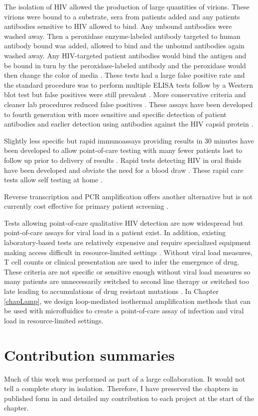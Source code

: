 \documentclass[../sherrill-Mix_thesis.tex]{subfiles}
\begin{document}
	The isolation of HIV \citep{Barre-Sinoussi1983,Gallo1983,Popovic1984,Levy1984} allowed the production of large quantities of virions. These virions were bound to a substrate, sera from patients added and any patients antibodies sensitive to HIV allowed to bind. Any unbound antibodies were washed away. Then a peroxidase enzyme-labeled antibody targeted to human antibody bound was added, allowed to bind and the unbound antibodies again washed away. Any HIV-targeted patient antibodies would bind the antigen and be bound in turn by the peroxidase-labeled antibody and the peroxidase would then change the color of media \citep{Safai1984,Sarngadharan1984}. These tests had a large false positive rate and the standard procedure was to perform multiple ELISA tests follow by a Western blot test \citep{Towbin1979,CDC1985} but false positives were still prevalent \citep{Burke1986}. More conservative criteria and cleaner lab procedures reduced false positives \citep{Burke1988}. These assays have been developed to fourth generation \citep{Chappel2009} with more sensitive and specific detection of patient antibodies and earlier detection using antibodies against the HIV capsid protein \citep{Weber1998,Weber2002}.  

	Slightly less specific but rapid immunoassays providing results in 30 minutes have been developed to allow point-of-care testing with many fewer patients lost to follow up prior to delivery of results \citep{Kassler1995,CDCP1998,CDCP2002}. Rapid tests detecting HIV in oral fluids have been developed and obviate the need for a blood draw \citep{Gallo1997,Delaney2006,SemaBaltazar2014}. These rapid care tests allow self testing at home \citep{Granade2004,PantPai2013}.

	Reverse transcription and PCR amplification offers another alternative \citep{Hart1988,Ou1988} but is not currently cost effective for primary patient screening \citep{Long2011}.

	Tests allowing point-of-care qualitative HIV detection are now widespread but point-of-care assays for viral load in a patient exist. In addition, existing laboratory-based tests are relatively expensive and require specialized equipment making access difficult in resource-limited settings \citep{Fiscus2006,Wang2010a}. Without viral load measures, \cdFour{} T cell counts or clinical presentation are used to infer the emergence of drug. These criteria are not specific or sensitive enough without viral load measures so many patients are unnecessarily switched to second line therapy \citep{Mee2008,VanOosterhout2009} or switched too late leading to accumulations of drug resistant mutations \citep{Hosseinipour2009}.  In Chapter \ref{chapLamp}, we design loop-mediated isothermal amplification methods that can be used with microfluidics to create a point-of-care assay of infection and viral load in resource-limited settings.

\section{Contribution summaries}
	Much of this work was performed as part of a large collaboration. It would not tell a complete story in isolation. Therefore, I have preserved the chapters in published form in and detailed my contribution to each project at the start of the chapter.
\end{document}
